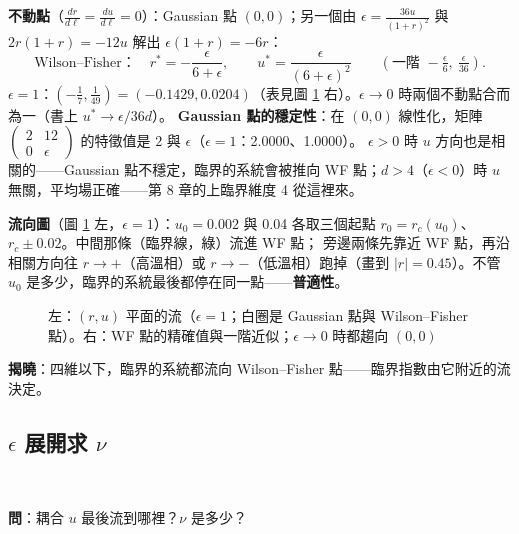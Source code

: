 \textbf{不動點}（$\frac{dr}{d\ell}=\frac{du}{d\ell}=0$）：Gaussian 點 $(0,0)$；另一個由 $\epsilon=\frac{36u}{(1+r)^2}$ 與 $2r(1+r)=-12u$ 解出 $\epsilon(1+r)=-6r$：
\[\text{Wilson--Fisher：}\quad r^*=-\frac{\epsilon}{6+\epsilon},\qquad u^*=\frac{\epsilon}{(6+\epsilon)^2}\qquad(\text{一階 }-\tfrac\epsilon6,\ \tfrac\epsilon{36}).\]
$\epsilon=1$：$(-\frac17,\frac1{49})=(-0.1429,0.0204)$（表見圖 \ref{twelve-fig-flow} 右）。$\epsilon\to0$ 時兩個不動點合而為一（書上 $u^*\to\epsilon/36d$）。
\textbf{Gaussian 點的穩定性}：在 $(0,0)$ 線性化，矩陣 $\begin{pmatrix}2&12\\0&\epsilon\end{pmatrix}$ 的特徵值是 $2$ 與 $\epsilon$（$\epsilon=1$：2.0000、1.0000）。
$\epsilon>0$ 時 $u$ 方向也是相關的——Gaussian 點不穩定，臨界的系統會被推向 WF 點；$d>4$（$\epsilon<0$）時 $u$ 無關，平均場正確——第 8 章的上臨界維度 4 從這裡來。

\textbf{流向圖}（圖 \ref{twelve-fig-flow} 左，$\epsilon=1$）：$u_0=0.002$ 與 0.04 各取三個起點 $r_0=r_c(u_0)$、$r_c\pm0.02$。中間那條（臨界線，綠）流進 WF 點；
旁邊兩條先靠近 WF 點，再沿相關方向往 $r\to+$（高溫相）或 $r\to-$（低溫相）跑掉（畫到 $|r|=0.45$）。不管 $u_0$ 是多少，臨界的系統最後都停在同一點——\textbf{普適性}。

\begin{figure}[htbp]
\centering
\begin{minipage}[c]{0.5\linewidth}\centering\TwelveFigFlow\end{minipage}\hfill
\begin{minipage}[c]{0.48\linewidth}\centering\footnotesize\setlength{\tabcolsep}{3pt}\TwelveTabFixed\end{minipage}
\caption{左：$(r,u)$ 平面的流（$\epsilon=1$；白圈是 Gaussian 點與 Wilson--Fisher 點）。右：WF 點的精確值與一階近似；$\epsilon\to0$ 時都趨向 $(0,0)$}\label{twelve-fig-flow}
\end{figure}

\textbf{揭曉}：四維以下，臨界的系統都流向 Wilson--Fisher 點——臨界指數由它附近的流決定。

\subsection{\texorpdfstring{$\epsilon$ 展開求 $\nu$}{ε 展開求 ν}}
\leavevmode{}\ \par\nopagebreak

\textbf{問}：耦合 $u$ 最後流到哪裡？$\nu$ 是多少？

